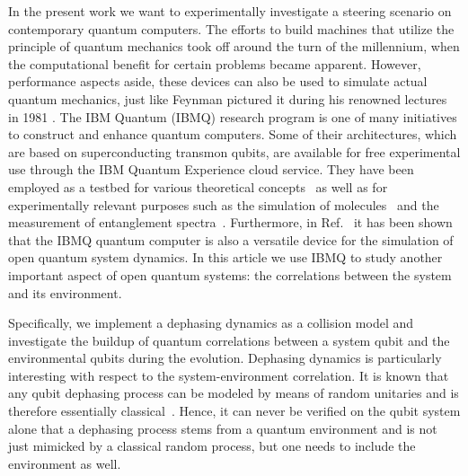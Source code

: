 \documentclass[aps,pra,twocolumn,superscriptaddress,showemail,showpacs,longbibliography]{revtex4-2}
\begin{document}
In the present work we want to experimentally investigate a steering scenario on contemporary quantum computers. The efforts to build machines that utilize the principle of quantum mechanics took off around the turn of the millennium, when the computational benefit for certain problems became apparent. However, performance aspects aside, these devices can also be used to simulate actual quantum mechanics, just like Feynman pictured it during his renowned lectures in 1981 \cite{FeynmanSimulating-physics-with1982}. The IBM Quantum (IBMQ) \cite{ibmq2021} research program is one of many initiatives to construct and enhance quantum computers. Some of their architectures, which are based on superconducting transmon qubits, are available for free experimental use through the IBM Quantum Experience cloud service. They have been employed as a testbed for various theoretical concepts~\cite{wang16qubitIBMUniversal2018,koppenhoferQuantumSynchronizationIBM2020,riedelgardingBellDiagonalWerner2021} as well as for experimentally relevant purposes such as the simulation of molecules~\cite{leonticaSimulatingMoleculesCloudbased2021} and the measurement of entanglement spectra~\cite{chooMeasurementEntanglementSpectrum2018}.
Furthermore, in Ref.~\cite{garcia-perezIBMExperienceVersatile2020} it has been shown that the IBMQ quantum computer is also a versatile device for the simulation of open quantum system dynamics. In this article we use IBMQ to study another important aspect of open quantum systems: the correlations between the system and its environment. 

Specifically, we implement a dephasing dynamics as a collision model and investigate the buildup of quantum correlations between a system qubit and the environmental qubits during the evolution. Dephasing dynamics is particularly interesting with respect to the system-environment correlation. It is known that any qubit dephasing process can be modeled by means of random unitaries and is therefore essentially classical~\cite{kummererEssentiallyCommutativeDilations1987,landauBirkhoffTheoremDoubly1993,buscemiInvertingQuantumDecoherence2005,perniceSystemEnvironmentCorrelations2012}. Hence, it can never be verified on the qubit system alone that a dephasing process stems from a quantum environment and is not just mimicked by a classical random process, but one needs to include the environment as well.
\end{document}

